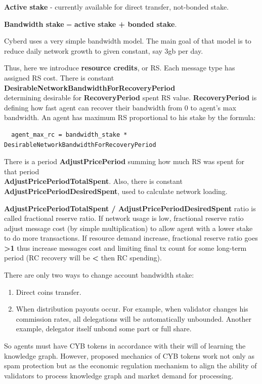 \documentclass[10pt,oneside]{amsart}
\newcommand{\code}[1]{\textbf{#1}}
\begin{document}
\code{Active stake} - currently available for direct transfer, not-bonded stake.

\code{Bandwidth stake} = \code{active stake + bonded stake}.

Cyberd uses a very simple bandwidth model. The main goal of that model is to reduce daily network growth to given constant, say 3gb per day.

Thus, here we introduce \code{resource credits}, or RS. Each message type has assigned RS cost. There is constant \code{DesirableNetworkBandwidthForRecoveryPeriod}\\
determining desirable for \code{RecoveryPeriod} spent RS value. \code{RecoveryPeriod} is defining how fast agent can recover their bandwidth from 0 to agent's max bandwidth. An agent has maximum RS proportional to his stake by the formula:

\begin{lstlisting}
  agent_max_rc = bandwidth_stake * DesirableNetworkBandwidthForRecoveryPeriod
\end{lstlisting}

There is a period \code{AdjustPricePeriod} summing how much RS was spent for that period\\ \code{AdjustPricePeriodTotalSpent}. Also, there is constant \code{AdjustPricePeriodDesiredSpent}, used to calculate network loading.

\code{AdjustPricePeriodTotalSpent / AdjustPricePeriodDesiredSpent} ratio is called fractional reserve ratio. If network usage is low, fractional reserve ratio adjust message cost (by simple multiplication) to allow agent with a lower stake to do more transactions.
If resource demand increase, fractional reserve ratio goes \code{>1} thus increase messages cost and limiting final tx count for some long-term period (RC recovery will be \code{<} then RC spending).

There are only two ways to change account bandwidth stake:

\begin{enumerate}
\item Direct coins transfer.
\item When distribution payouts occur. For example, when validator changes his commission rates, all delegations will be automatically unbounded. Another example, delegator itself unbond some part or full share.
\end{enumerate}

So agents must have CYB tokens in accordance with their will of learning the knowledge graph. However, proposed mechanics of CYB tokens work not only as spam protection but as the economic regulation mechanism to align the ability of validators to process knowledge graph and market demand for processing.
\end{document}
